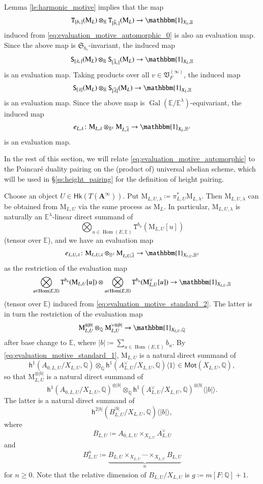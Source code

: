 \documentclass[12pt]{amsart}
\numberwithin{equation}{section}
\theoremstyle{plain}
\theoremstyle{definition}
\theoremstyle{remark}
\renewcommand{\b}[1]{\mathbf{#1}}
\renewcommand{\d}[1]{\mathbb{#1}}
\newcommand{\f}[1]{\mathfrak{#1}}
\renewcommand{\r}[1]{\mathrm{#1}}
\renewcommand{\sf}[1]{\mathsf{#1}}
\renewcommand{\(}{\left(}
\renewcommand{\)}{\right)}
\newcommand{\ang}[1]{\langle{#1}\rangle}
\newcommand{\ol}[1]{\overline{#1}{}}
\renewcommand{\geq}{\geqslant}
\newcommand{\bA}{\b A}
\newcommand{\dE}{\d E}
\newcommand{\dQ}{\d Q}
\newcommand{\fS}{\f S}
\newcommand{\fV}{\f V}
\newcommand{\rM}{\r M}
\newcommand{\sfh}{\sf h}
\newcommand{\tS}{\mathtt{S}}
\newcommand{\tT}{\mathtt{T}}
\newcommand{\Hk}{\sf{Hk}}
\newcommand{\Mot}{\sf{Mot}}
\DeclareMathOperator{\Gal}{Gal}
\DeclareMathOperator{\Hom}{Hom}
\begin{document}
Lemma \ref{le:harmonic_motive} implies that the map
\[
\tT_{[b_v]}(\rM_L)\otimes_\dE\tT_{[\ol{b}_v]}(\rM_L)\to\mathbbm{1}_{X_L,\dE}
\]
induced from \eqref{eq:evaluation_motive_automorphic_0} is also an evaluation map. Since the above map is $\fS_{b_v}$-invariant, the induced map
\[
\tS_{[\lambda_v]}(\rM_L)\otimes_\dE\tS_{[\ol\lambda_v]}(\rM_L)\to\mathbbm{1}_{X_L,\dE}
\]
is an evaluation map. Taking products over all $v\in\fV_F^{(\infty)}$, the induced map
\[
\tS_{[\lambda]}(\rM_L)\otimes_\dE\tS_{[\ol\lambda]}(\rM_L)\to\mathbbm{1}_{X_L,\dE}
\]
is an evaluation map. Since the above map is $\Gal(\dE/\dE^\lambda)$-equivariant, the induced map
\begin{align}\label{eq:evaluation_motive_automorphic}
e_{L,\lambda}\colon \rM_{L,\lambda}\otimes_{\dE^\lambda}\rM_{L,\ol\lambda}\to\mathbbm{1}_{X_L,\dE^\lambda}
\end{align}
is an evaluation map.



In the rest of this section, we will relate \eqref{eq:evaluation_motive_automorphic} to the Poincar\'{e} duality pairing on the (product of) universal abelian scheme, which will be used in \S\ref{ss:height_pairing} for the definition of height pairing.


Choose an object $U\in\Hk(T(\bA^\infty))$. Put $\rM_{L,U,\lambda}\coloneqq\pi_{L,U}^*\rM_{L,\lambda}$. Then $\rM_{L,U,\lambda}$ can be obtained from $\rM_{L,U}$ via the same process as $\rM_L$. In particular, $\rM_{L,U,\lambda}$ is naturally an $\dE^\lambda$-linear direct summand of
\[
\bigotimes_{u\in\Hom(E,\dE)}\tT^{b_u}(\rM_{L,U}[u])
\]
(tensor over $\dE$), and we have an evaluation map
\[
e_{L,U,\lambda}\colon\rM_{L,U,\lambda}\otimes_{\dE^\lambda}\rM_{L,U,\ol\lambda}\to\mathbbm{1}_{X_{L,U},\dE^\lambda}
\]
as the restriction of the evaluation map
\[
\bigotimes_{u\in\Hom(E,\dE)}\tT^{b_u}(\rM_{L,U}[u])\otimes\bigotimes_{u\in\Hom(E,\dE)}\tT^{b_u}(\rM_{L,U}^\vee[u])
\to\mathbbm{1}_{X_{L,U},\dE}
\]
(tensor over $\dE$) induced from \eqref{eq:evaluation_motive_standard_2}. The latter is in turn the restriction of the evaluation map
\[
\rM_{L,U}^{\otimes|b|}\otimes_\dQ\rM_{L,U}^{\vee\otimes|b|}\to\mathbbm{1}_{X_{L,U},\dQ}
\]
after base change to $\dE$, where $|b|\coloneqq\sum_{u\in\Hom(E,\dE)}b_u$. By \eqref{eq:evaluation_motive_standard_1}, $\rM_{L,U}$ is a natural direct summand of
\[
\sfh^1(A_{0,L,U}/X_{L,U},\dQ)\otimes_\dQ\sfh^1(A_{L,U}^\vee/X_{L,U},\dQ)\ang{1}\in\Mot(X_{L,U},\dQ),
\]
so that $\rM_{L,U}^{\otimes|b|}$ is a natural direct summand of
\[
\sfh^1(A_{0,L,U}/X_{L,U},\dQ)^{\otimes|b|}\otimes_\dQ\sfh^1(A_{L,U}^\vee/X_{L,U},\dQ)^{\otimes|b|}\ang{|b|}.
\]
The latter is a natural direct summand of
\[
\sfh^{2|b|}(B_{L,U}^{|b|}/X_{L,U},\dQ)\ang{|b|},
\]
where
\[
B_{L,U}\coloneqq A_{0,L,U}\times_{X_{L,U}}A_{L,U}^\vee
\]
and
\begin{align}\label{eq:kuga_sato}
B_{L,U}^n\coloneqq\underbrace{B_{L,U}\times_{X_{L,U}}\cdots\times_{X_{L,U}}B_{L,U}}_n
\end{align}
for $n\geq 0$. Note that the relative dimension of $B_{L,U}/X_{L,U}$ is $g\coloneqq m[F:\dQ]+1$.
\end{document}
